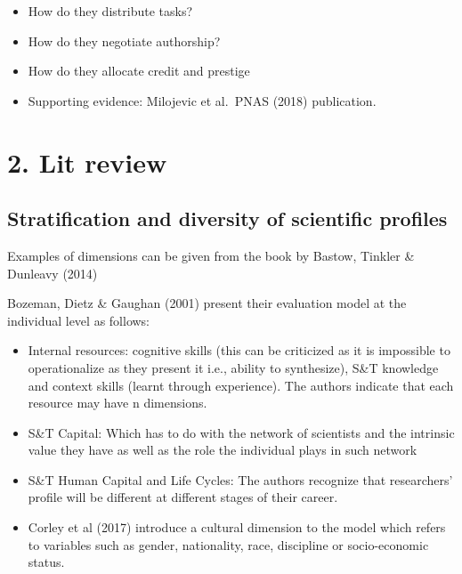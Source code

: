 \documentclass[]{elsarticle} %
\providecommand{\tightlist}{%
  \setlength{\itemsep}{0pt}\setlength{\parskip}{0pt}}
\begin{document}
\begin{itemize}
\tightlist
\item
  How do they distribute tasks?
\item
  How do they negotiate authorship?
\item
  How do they allocate credit and prestige
\item
  Supporting evidence: Milojevic et al.~PNAS (2018) publication.
\end{itemize}

\hypertarget{lit-review}{%
\section{2. Lit review}\label{lit-review}}

\hypertarget{stratification-and-diversity-of-scientific-profiles}{%
\subsection{Stratification and diversity of scientific
profiles}\label{stratification-and-diversity-of-scientific-profiles}}

Examples of dimensions can be given from the book by Bastow, Tinkler \&
Dunleavy (2014)

Bozeman, Dietz \& Gaughan (2001) present their evaluation model at the
individual level as follows:

\begin{itemize}
\tightlist
\item
  Internal resources: cognitive skills (this can be criticized as it is
  impossible to operationalize as they present it i.e., ability to
  synthesize), S\&T knowledge and context skills (learnt through
  experience). The authors indicate that each resource may have n
  dimensions.
\item
  S\&T Capital: Which has to do with the network of scientists and the
  intrinsic value they have as well as the role the individual plays in
  such network
\item
  S\&T Human Capital and Life Cycles: The authors recognize that
  researchers' profile will be different at different stages of their
  career.
\item
  Corley et al (2017) introduce a cultural dimension to the model which
  refers to variables such as gender, nationality, race, discipline or
  socio-economic status.
\end{itemize}
\end{document}

